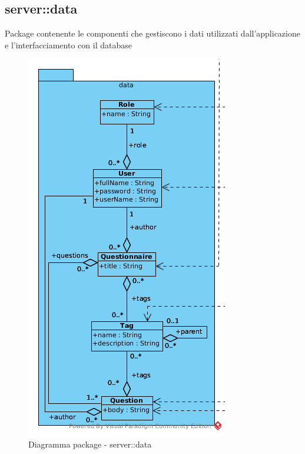 \subsection{server::data}
Package contenente le componenti che gestiscono i dati utilizzati dall'applicazione e l'interfacciamento con il database\begin{center}
		\begin{figure}[H]
			\centering \includegraphics[scale=4, max width=\textwidth, max height=\myheight]{../img/diagrammiClassi/server/data.png}
			\caption{Diagramma package - server::data}
		\end{figure}
	\end{center}\hypertarget{server::data::Tag}{}
